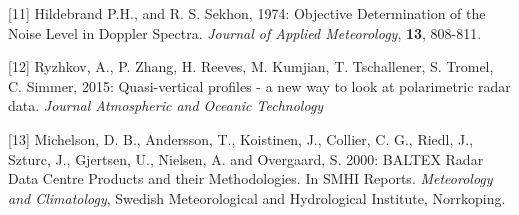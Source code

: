 \documentclass[potrait, z1paper, fontscale=0.33]{baposter} %
\begin{document}
\begin{poster}
{[11] Hildebrand P.H., and R. S. Sekhon, 1974: Objective Determination of the Noise Level in Doppler Spectra. \textit{Journal of Applied Meteorology}, \textbf{13}, 808-811.
\medskip

[12] Ryzhkov, A., P. Zhang, H. Reeves, M. Kumjian, T. Tschallener, S. Tromel,
C. Simmer, 2015: Quasi-vertical profiles - a new way to look at polarimetric
radar data. \textit{Journal Atmospheric and Oceanic Technology}
\medskip

[13] Michelson, D. B., Andersson, T., Koistinen, J., Collier, C. G., Riedl, J.,
Szturc, J., Gjertsen, U., Nielsen, A. and Overgaard, S. 2000: BALTEX Radar
Data Centre Products and their Methodologies. In SMHI Reports. \textit{Meteorology
and Climatology}, Swedish Meteorological and Hydrological Institute, Norrkoping.
}
\end{poster}
\end{document}
